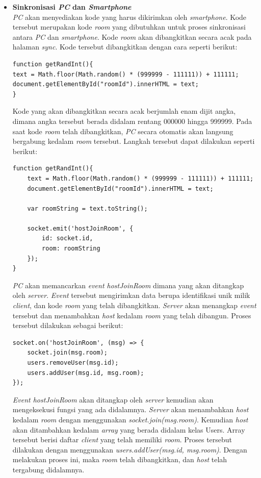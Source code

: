 \begin{enumerate}
\begin{itemize}
		\item \textbf{Sinkronisasi \textit{PC} dan \textit{Smartphone}} \\
		\textit{PC} akan menyediakan kode yang harus dikirimkan oleh \textit{smartphone}. Kode tersebut merupakan kode \textit{room} yang dibutuhkan untuk proses sinkronisasi antara \textit{PC} dan \textit{smartphone}. Kode \textit{room} akan dibangkitkan secara acak pada halaman \textit{sync}. Kode tersebut dibangkitkan dengan cara seperti berikut:
\begin{lstlisting}
function getRandInt(){
text = Math.floor(Math.random() * (999999 - 111111)) + 111111;
document.getElementById("roomId").innerHTML = text;
}
\end{lstlisting}
		Kode yang akan dibangkitkan secara acak berjumlah enam dijit angka, dimana angka tersebut berada didalam rentang 000000 hingga 999999. Pada saat kode \textit{room} telah dibangkitkan, \textit{PC} secara otomatis akan langsung bergabung kedalam \textit{room} tersebut. Langkah tersebut dapat dilakukan seperti berikut:
\begin{lstlisting}
function getRandInt(){
	text = Math.floor(Math.random() * (999999 - 111111)) + 111111;
	document.getElementById("roomId").innerHTML = text;

	var roomString = text.toString();

	socket.emit('hostJoinRoom', {
		id: socket.id,
		room: roomString
	});
}
\end{lstlisting}
		\textit{PC} akan memancarkan \textit{event hostJoinRoom} dimana yang akan ditangkap oleh \textit{server}. \textit{Event} tersebut mengirimkan data berupa identifikasi unik milik \textit{client}, dan kode \textit{room} yang telah dibangkitkan. \textit{Server} akan menangkap \textit{event} tersebut dan menambahkan \textit{host} kedalam \textit{room} yang telah dibangun. Proses tersebut dilakukan sebagai berikut:
\begin{lstlisting}
socket.on('hostJoinRoom', (msg) => {
	socket.join(msg.room);
	users.removeUser(msg.id);
	users.addUser(msg.id, msg.room);
});
\end{lstlisting}
		\textit{Event hostJoinRoom} akan ditangkap oleh \textit{server} kemudian akan mengeksekusi fungsi yang ada didalamnya. \textit{Server} akan menambahkan \textit{host} kedalam \textit{room} dengan menggunakan \textit{socket.join(msg.room)}. Kemudian \textit{host} akan ditambahkan kedalam \textit{array} yang berada didalam kelas Users. Array tersebut berisi daftar \textit{client} yang telah memiliki \textit{room}. Proses tersebut dilakukan dengan menggunakan \textit{users.addUser(msg.id, msg.room)}. Dengan melakukan proses ini, maka \textit{room} telah dibangkitkan, dan \textit{host} telah tergabung didalamnya.
		

\end{itemize}
\end{enumerate}
